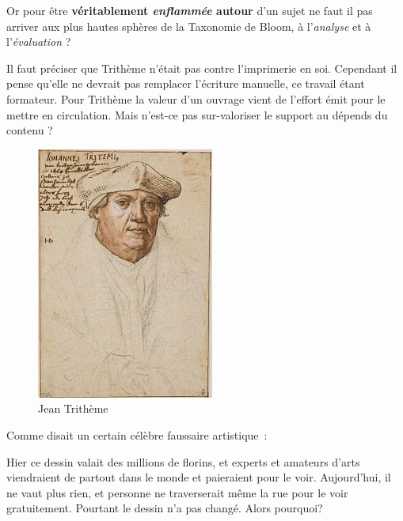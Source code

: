 \begin{minipage}[H]{0.54\linewidth}
Or pour être \textbf{véritablement \emph{enflammée} autour} d'un sujet ne faut il pas arriver aux plus hautes sphères de la Taxonomie de Bloom, à l'\emph{analyse} et à l'\emph{évaluation} ?

Il faut préciser que Trithème n'était pas contre l'imprimerie en soi. Cependant il pense qu'elle ne devrait pas remplacer l'écriture manuelle, ce travail étant formateur\cite{abbot-trithemius}. Pour Trithème la valeur d'un ouvrage vient de l'effort émit pour le mettre en circulation. Mais n'est-ce pas sur-valoriser le support au dépends du contenu ?
\vspace{1cm}
\end{minipage}
\begin{minipage}[H]{0.44\linewidth}
  \begin{figure}[H]
  \centering
  \includegraphics[height=0.15\paperheight]{../resources/illustrations/trithemius}
  \caption{Jean Trithème}
  \end{figure}
\end{minipage}

Comme disait un certain célèbre faussaire artistique~: 

\begin{coolquote}
Hier ce dessin valait des millions de florins, et experts et amateurs d'arts viendraient de partout dans le monde et paieraient pour le voir. Aujourd'hui, il ne vaut plus rien, et personne ne traverserait même la rue pour le voir gratuitement. Pourtant le dessin n'a pas changé. Alors pourquoi?
\end{coolquote}

